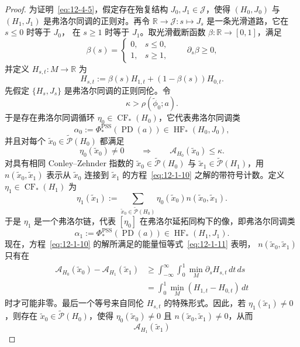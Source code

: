 \begin{proof}
为证明~\eqref{eq:12-4-5}，假定存在殆复结构 $J_0,J_1\in\mathcal J$，使得
$(H_0,J_0)$ 与 $(H_1,J_1)$ 是弗洛尔同调的正则对。再令
$\mathbb R\to\mathcal J:s\mapsto J_s$ 是一条光滑道路，它在 $s\le0$ 时等于 $J_0$，
在 $s\ge1$ 时等于 $J_1$。取光滑截断函数 $\beta:\mathbb R\to[0,1]$，满足
\[
  \beta(s)=
  \begin{cases}
    0,&s\le0,\\
    1,&s\ge1,
  \end{cases}
  \qquad \partial_s\beta\ge0,
\]
并定义 $H_{s,t}:M\to\mathbb R$ 为
\[
  H_{s,t}:=\beta(s)H_{1,t}+(1-\beta(s))H_{0,t}.
\]
先假定 $\{H_s,J_s\}$ 是弗洛尔同调的正则同伦。令
\[
  \kappa>\rho(\widetilde\phi_0;a).
\]
于是存在弗洛尔同调循环 $\eta_0\in\operatorname{CF}_*(H_0)$，它代表弗洛尔同调类
\[
  \alpha_0:=\Phi_*^{\mathrm{PSS}}(\operatorname{PD}(a))
  \in\operatorname{HF}_*(H_0,J_0),
\]
并且对每个 $\widetilde x_0\in\widetilde{\mathcal P}(H_0)$ 都满足
\[
  \eta_0(\widetilde x_0)\ne0
  \qquad\Longrightarrow\qquad
  \mathcal A_{H_0}(\widetilde x_0)\le\kappa.
\]
对具有相同 Conley--Zehnder 指数的
$\widetilde x_0\in\widetilde{\mathcal P}(H_0)$ 与
$\widetilde x_1\in\widetilde{\mathcal P}(H_1)$，用
$n(\widetilde x_0,\widetilde x_1)$ 表示从 $\widetilde x_0$ 连接到
$\widetilde x_1$ 的方程~\eqref{eq:12-1-10} 之解的带符号计数。定义
$\eta_1\in\operatorname{CF}_*(H_1)$ 为
\[
  \eta_1(\widetilde x_1)
  :=\sum_{\widetilde x_0\in\widetilde{\mathcal P}(H_0)}
  \eta_0(\widetilde x_0)n(\widetilde x_0,\widetilde x_1).
\]
于是 $\eta_1$ 是一个弗洛尔链，代表 $[\eta_0]$ 在弗洛尔延拓同构下的像，即弗洛尔同调类
\[
  \alpha_1:=\Phi_*^{\mathrm{PSS}}(\operatorname{PD}(a))
  \in\operatorname{HF}_*(H_1,J_1).
\]
现在，方程~\eqref{eq:12-1-10} 的解所满足的能量恒等式~\eqref{eq:12-1-11} 表明，
$n(\widetilde x_0,\widetilde x_1)$ 只有在
\[
\begin{aligned}
  \mathcal A_{H_0}(\widetilde x_0)-\mathcal A_{H_1}(\widetilde x_1)
  &\ge\int_{-\infty}^{\infty}\int_0^1
  \min_M\partial_sH_{s,t}\,dt\,ds\\
  &=\int_0^1\min_M(H_{1,t}-H_{0,t})\,dt
\end{aligned}
\]
时才可能非零。最后一个等号来自同伦 $H_{s,t}$ 的特殊形式。因此，若
$\eta_1(\widetilde x_1)\ne0$，则存在
$\widetilde x_0\in\widetilde{\mathcal P}(H_0)$，使得
$\eta_0(\widetilde x_0)\ne0$ 且
$n(\widetilde x_0,\widetilde x_1)\ne0$，从而
\[
  \mathcal A_{H_1}(\widetilde x_1)
\]
\end{proof}
